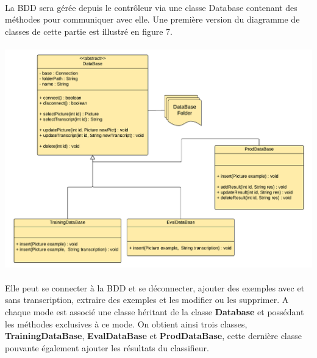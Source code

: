 \paragraph{}

La BDD sera gérée depuis le contrôleur via une classe Database contenant des méthodes pour communiquer avec elle. Une première version du diagramme de classes de cette partie est illustré en figure 7.

\paragraph{}

\begin{mdframed}[frametitle={Figure 8 : Diagramme de classes de l'interface avec la BDD}, innerbottommargin=10]
\begin{center}
\includegraphics[scale=0.6]{bdd.pdf}
\end{center}
\end{mdframed}

\paragraph{}

Elle peut se connecter à la BDD et se déconnecter, ajouter des exemples avec et sans transcription, extraire des exemples et les modifier ou les supprimer. A chaque mode est associé une classe héritant de la classe \textbf{Database} et possédant les méthodes exclusives à ce mode. On obtient ainsi trois classes, \textbf{TrainingDataBase}, \textbf{EvalDataBase} et \textbf{ProdDataBase}, cette dernière classe pouvante également ajouter les résultats du classifieur.


